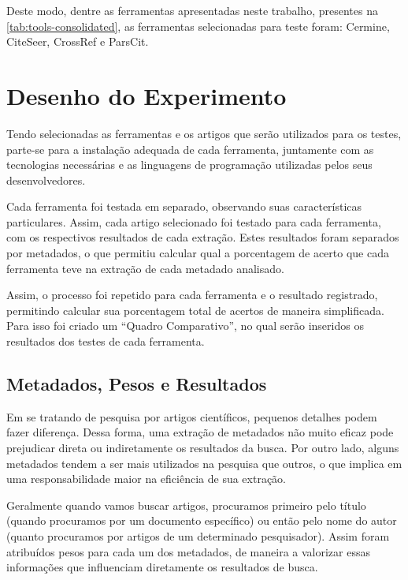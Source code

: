 Deste modo, dentre as ferramentas apresentadas neste trabalho, presentes na \autoref{tab:tools-consolidated}, as ferramentas selecionadas para teste foram: Cermine, CiteSeer, CrossRef e ParsCit.
    

\section{Desenho do Experimento}
\label{sec:experiment-design}

Tendo selecionadas as ferramentas e os artigos que serão utilizados para os testes, parte-se para a instalação adequada de cada ferramenta, juntamente com as tecnologias necessárias e as linguagens de programação utilizadas pelos seus desenvolvedores. 

Cada ferramenta foi testada em separado, observando suas características particulares. Assim, cada artigo selecionado foi testado para cada ferramenta, com os respectivos resultados de cada extração. Estes resultados foram separados por metadados, o que permitiu calcular qual a porcentagem de acerto que cada ferramenta teve na extração de cada metadado analisado.

Assim, o processo foi repetido para cada ferramenta e o resultado registrado, permitindo calcular sua porcentagem total de acertos de maneira simplificada. Para isso foi criado um ``Quadro Comparativo'', no qual serão inseridos os resultados dos testes de cada ferramenta. 

\subsection{Metadados, Pesos e Resultados}
\label{ssec:metadata-results}


Em se tratando de pesquisa por artigos científicos, pequenos detalhes podem fazer diferença. Dessa forma, uma extração de metadados não muito eficaz pode prejudicar direta ou indiretamente os resultados da busca. Por outro lado, alguns metadados tendem a ser mais utilizados na pesquisa que outros, o que implica em uma responsabilidade maior na eficiência de sua extração. 


Geralmente quando vamos buscar artigos, procuramos primeiro pelo título (quando procuramos por um documento específico) ou então pelo nome do autor (quanto procuramos por artigos de um determinado pesquisador). Assim foram atribuídos pesos para cada um dos metadados, de maneira a valorizar essas informações que influenciam diretamente os resultados de busca.


